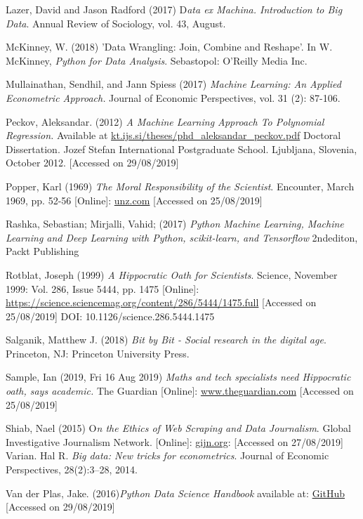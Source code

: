 \documentclass[12pt,a4paper]{article}
\begin{document}
Lazer, David and Jason Radford (2017) D\textit{ata ex Machina. Introduction to Big Data}. Annual Review of Sociology, vol. 43, August.

McKinney, W. (2018) ’Data Wrangling: Join, Combine and Reshape’. In W. McKinney, \textit{Python for Data Analysis}. Sebastopol: O’Reilly Media Inc.

Mullainathan, Sendhil, and Jann Spiess (2017)\textit{ Machine Learning: An Applied Econometric Approach.} Journal of Economic Perspectives, vol. 31 (2): 87-106.

Peckov, Aleksandar. (2012) \textit{A Machine Learning Approach To Polynomial Regression.} Available at \url{kt.ijs.si/theses/phd_aleksandar_peckov.pdf} Doctoral Dissertation. Jozef Stefan International Postgraduate School. Ljubljana, Slovenia, October 2012. [Accessed on 29/08/2019]

Popper, Karl (1969) \textit{The Moral Responsibility of the Scientist}. Encounter, March 1969, pp. 52-56 [Online]: \href{http://www.unz.com/print/Encounter-1969mar-00052}{unz.com} [Accessed on 25/08/2019]

Rashka, Sebastian; Mirjalli, Vahid; (2017) \textit{Python Machine Learning, Machine Learning and Deep Learning with Python, scikit-learn, and Tensorflow} 2ndediton, Packt Publishing

Rotblat, Joseph (1999) \textit{A Hippocratic Oath for Scientists}. Science, November 1999: Vol. 286, Issue 5444, pp. 1475 [Online]: \url{https://science.sciencemag.org/content/286/5444/1475.full} [Accessed on 25/08/2019] DOI: 10.1126/science.286.5444.1475

Salganik, Matthew J. (2018) \textit{Bit by Bit - Social research in the digital age}. Princeton, NJ: Princeton University Press.

Sample, Ian (2019, Fri 16 Aug 2019) \textit{Maths and tech specialists need Hippocratic oath, says academic.} The Guardian [Online]: \href{https://www.theguardian.com/science/2019/aug/16/mathematicians-need-doctor-style-hippocratic-oath-says-academic-hannah-fry}{www.theguardian.com} [Accessed on 25/08/2019]

Shiab, Nael (2015) O\textit{n the Ethics of Web Scraping and Data Journalism}. Global Investigative Journalism Network. [Online]: \href{gijn.org/2015/08/12/on-the-ethics-of-web-scraping-and-data-journalism/}{gijn.org}: [Accessed on 27/08/2019]
Varian. Hal R. \textit{Big data: New tricks for econometrics}. Journal of Economic Perspectives, 28(2):3–28, 2014.

Van der Plas, Jake. (2016)\textit{Python Data Science Handbook} available at: \href{https://jakevdp.github.io/PythonDataScienceHandbook/05.03-hyperparameters-and-model-validation.html?fbclid=IwAR22jhu2nrTY3eJME4VTuTSLXNKqNMmPzlwU4-IJ8VvEMIsLy05-IqgQdsI}{GitHub} [Accessed on 29/08/2019]
\end{document}
